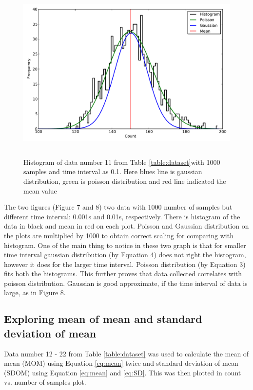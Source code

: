 \documentclass[a4paper,12pt]{article}
\begin{document}
\begin{figure}[H]
\centering
\includegraphics[angle=0,height=9cm,width=15.5cm]{graphs/Hist_distribution_big.pdf}
\caption{Histogram of data number 11 from Table \ref{table:dataset}with 1000 samples and time interval as 0.1. Here blues line is gaussian distribution, green is poisson distribution and red line indicated the mean value}
\label{fig:gaussian}
\end{figure}
The two figures (Figure 7 and 8) two data with 1000 number of samples but different time interval: 0.001s and 0.01s, respectively. There is histogram of the data in black and mean in red on each plot. Poisson and Gaussian distribution on the plots are multiplied by 1000 to obtain correct scaling for comparing with histogram. One of the main thing to notice in these two graph is that for smaller time interval gaussian distribution (by Equation 4) does not right the histogram, however it does for the larger time interval. Poisson distribution (by Equation 3) fits both the histograms. This further proves that data collected correlates with poisson distribution. Gaussian is good approximate, if the time interval of data is large, as in Figure 8.  

\subsection{Exploring mean of mean and standard deviation of mean}
\label{sec:MOM_SDOM}

Data number 12 - 22 from Table \ref{table:dataset} was used to calculate the mean of mean (MOM) using Equation \ref{eq:mean} twice and standard deviation of mean (SDOM) using Equation \ref{eq:mean} and  \ref{eq:SD}. This was then plotted in count vs. number of samples plot. 
\end{document}
